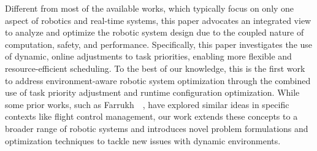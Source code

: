     Different from most of the available works, which typically focus on only one aspect of robotics and
	real-time systems, this paper advocates an integrated view to analyze and optimize the robotic system
	design due to the coupled nature of computation, safety, and performance.
    Specifically, this paper investigates the use of dynamic, online adjustments to task priorities,
    enabling more flexible and resource-efficient scheduling. To the best of our knowledge, this is the
    first work to address environment-aware robotic system optimization through the combined use of task
    priority adjustment and runtime configuration optimization. While some prior works, such as
    Farrukh~\etal~\cite{Farrukh2020}, have explored similar ideas in specific contexts like flight
    control management, our work extends these concepts to a broader range of robotic systems and
    introduces novel problem formulations and optimization techniques to tackle new issues with dynamic
    environments.
